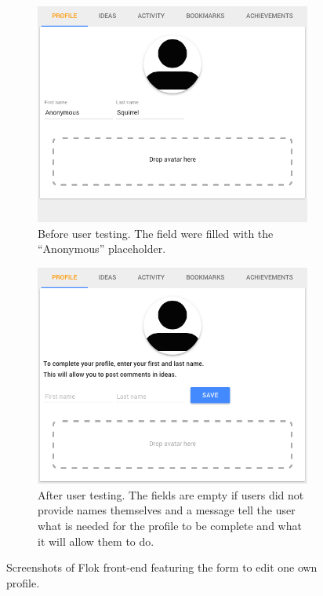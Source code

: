 \documentclass[a4paper,12pt, oneside]{article}
\begin{document}
\begin{figure}[!htb]
    \begin{subfigure}[t]{.495\textwidth}
        \includegraphics[width=\textwidth]{images/user_tests/profileForm_before.png}
        \caption{Before user testing. The field were filled with the “Anonymous” placeholder.}
        \label{fig.tests.profileForm.before}
    \end{subfigure}
    \hfill
    \begin{subfigure}[t]{.495\textwidth}
        \includegraphics[width=\textwidth]{images/user_tests/profileForm_after.png}
        \caption{After user testing. The fields are empty if users did not provide names themselves and a message tell the user what is needed for the profile to be complete and what it will allow them to do.}
        \label{fig.tests.profileForm.after}
    \end{subfigure}
    \caption{Screenshots of Flok front-end featuring the form to edit one own profile.}
    \label{fig.tests.profileForm}
\end{figure}
\end{document}
